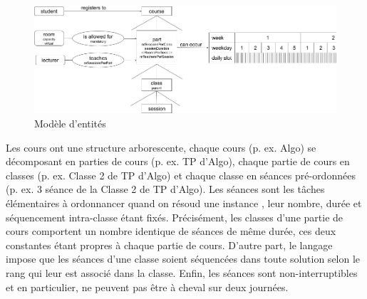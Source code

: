 \begin{figure}[ht]
\centering
\includegraphics[width=.85\textwidth]{img/utp_entity_model.png}
\caption{Modèle d'entités}
\label{fig:utp-entity-model}
\end{figure}

Les cours ont une structure arborescente, chaque cours (p. ex. Algo) se décomposant en parties de cours (p. ex. TP d'Algo), chaque partie de cours en classes (p. ex. Classe 2 de TP d'Algo) et chaque classe en séances pré-ordonnées (p. ex. 3 séance de la Classe 2 de TP d'Algo).
Les séances sont les tâches élémentaires à ordonnancer quand on résoud une instance {\UTP}, leur nombre, durée et séquencement intra-classe étant fixés.
Précisément, les classes d'une partie de cours comportent un nombre identique de séances de même durée, ces deux constantes étant propres à chaque partie de cours.
%
%
%
D'autre part, le langage impose que les séances d'une classe soient séquencées dans toute solution selon le rang qui leur est associé dans la classe.
Enfin, les séances sont non-interruptibles et en particulier, ne peuvent pas être à cheval sur deux journées.


